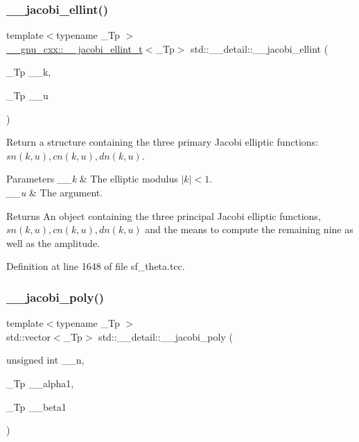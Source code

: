 \subsubsection{\texorpdfstring{\+\_\+\+\_\+jacobi\+\_\+ellint()}{\_\_jacobi\_ellint()}}
{\footnotesize\ttfamily template$<$typename \+\_\+\+Tp $>$ \\
\hyperlink{struct____gnu__cxx_1_1____jacobi__ellint__t}{\+\_\+\+\_\+gnu\+\_\+cxx\+::\+\_\+\+\_\+jacobi\+\_\+ellint\+\_\+t}$<$\+\_\+\+Tp$>$ std\+::\+\_\+\+\_\+detail\+::\+\_\+\+\_\+jacobi\+\_\+ellint (\begin{DoxyParamCaption}\item[{\+\_\+\+Tp}]{\+\_\+\+\_\+k,  }\item[{\+\_\+\+Tp}]{\+\_\+\+\_\+u }\end{DoxyParamCaption})}

Return a structure containing the three primary Jacobi elliptic functions\+: $ sn(k, u), cn(k, u), dn(k, u) $.


\begin{DoxyParams}{Parameters}
{\em \+\_\+\+\_\+k} & The elliptic modulus $ |k| < 1 $. \\
\hline
{\em \+\_\+\+\_\+u} & The argument. \\
\hline
\end{DoxyParams}
\begin{DoxyReturn}{Returns}
An object containing the three principal Jacobi elliptic functions, $ sn(k, u), cn(k, u), dn(k, u) $ and the means to compute the remaining nine as well as the amplitude. 
\end{DoxyReturn}


Definition at line 1648 of file sf\+\_\+theta.\+tcc.

\mbox{\label{namespacestd_1_1____detail_a2d6a3ca0a988687e038522376aa78df1}} 
\subsubsection{\texorpdfstring{\+\_\+\+\_\+jacobi\+\_\+poly()}{\_\_jacobi\_poly()}}
{\footnotesize\ttfamily template$<$typename \+\_\+\+Tp $>$ \\
std\+::vector$<$\+\_\+\+Tp$>$ std\+::\+\_\+\+\_\+detail\+::\+\_\+\+\_\+jacobi\+\_\+poly (\begin{DoxyParamCaption}\item[{unsigned int}]{\+\_\+\+\_\+n,  }\item[{\+\_\+\+Tp}]{\+\_\+\+\_\+alpha1,  }\item[{\+\_\+\+Tp}]{\+\_\+\+\_\+beta1 }\end{DoxyParamCaption})}

